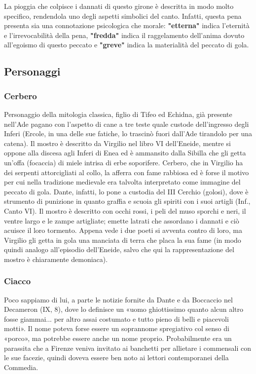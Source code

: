 \documentclass[10pt,a4paper]{article}
\begin{document}
	La pioggia che colpisce i dannati di questo girone è descritta in modo molto specifico, rendendola uno degli aspetti simbolici del canto. Infatti, questa pena presenta sia una connotazione psicologica che morale: \textbf{"etterna"} indica l'eternità e l'irrevocabilità della pena, \textbf{"fredda"} indica il raggelamento dell'anima dovuto all'egoismo di questo peccato e \textbf{"greve"} indica la materialità del peccato di gola.
	
	\subsection{Personaggi}
	
	\subsubsection{Cerbero}
	
	Personaggio della mitologia classica, figlio di Tifeo ed Echidna, già presente nell'Ade pagano con l'aspetto di cane a tre teste quale custode dell'ingresso degli Inferi (Ercole, in una delle sue fatiche, lo trascinò fuori dall'Ade tirandolo per una catena). Il mostro è descritto da Virgilio nel libro VI dell'Eneide, mentre si oppone alla discesa agli Inferi  di Enea ed è ammansito dalla Sibilla che gli getta un'offa (focaccia) di miele intrisa di erbe soporifere. Cerbero, che in Virgilio ha dei serpenti attorcigliati al collo, la afferra con fame rabbiosa ed è forse il motivo per cui nella tradizione medievale era talvolta interpretato come immagine del peccato di gola.
	Dante, infatti, lo pone a custodia del III Cerchio (golosi), dove è strumento di punizione in quanto graffia e scuoia gli spiriti con i suoi artigli (Inf., Canto VI). Il mostro è descritto con occhi rossi, i peli del muso sporchi e neri, il ventre largo e le zampe artigliate; emette latrati che assordano i dannati e ciò acuisce il loro tormento. Appena vede i due poeti si avventa contro di loro, ma Virgilio gli getta in gola una manciata di terra che placa la sua fame (in modo quindi analogo all'episodio dell'Eneide, salvo che qui la rappresentazione del mostro è chiaramente demoniaca). 
	
	\subsubsection{Ciacco}
	
	Poco sappiamo di lui, a parte le notizie fornite da Dante e da Boccaccio nel Decameron (IX, 8), dove lo definisce un «uomo ghiottissimo quanto alcun altro fosse giammai... per altro assai costumato e tutto pieno di belli e piacevoli motti». Il nome poteva forse essere un soprannome spregiativo col senso di «porco», ma potrebbe essere anche un nome proprio. Probabilmente era un parassita che a Firenze veniva invitato ai banchetti per allietare i commensali con le sue facezie, quindi doveva essere ben noto ai lettori contemporanei della Commedia.
	
\end{document}
